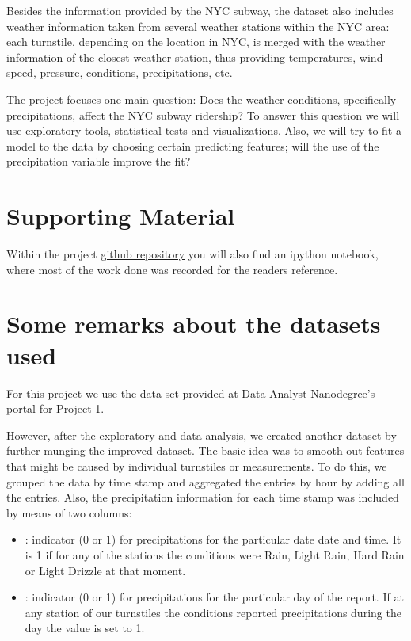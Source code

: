 \documentclass[a4paper,12pt,english]{sphinxmanual}
\begin{document}
Besides the information provided by the NYC subway, the dataset also includes
weather information taken from several weather stations within the NYC area:
each turnstile, depending on the location in NYC, is merged with the weather
information of the closest weather station, thus providing temperatures, wind
speed, pressure, conditions, precipitations, etc.

The project focuses one main question: Does the weather conditions, specifically
precipitations, affect the NYC subway ridership? To answer this question we
will use exploratory tools, statistical tests and visualizations. Also, we will
try to fit a model to the data by choosing certain predicting features; will
the use of the precipitation variable improve the fit?


\section{Supporting Material}
\label{overview:supporting-material}
Within the project \href{https://github.com/itoledoc/IntroToDS}{github repository}
you will also find an ipython notebook, where most of the work done was recorded
for the readers reference.


\section{Some remarks about the datasets used}
\label{overview:some-remarks-about-the-datasets-used}
For this project we use the data set provided at Data Analyst Nanodegree's
portal for Project 1.

However, after the exploratory and data analysis, we created another dataset by
further munging the improved dataset. The basic idea was to smooth out features
that might be caused by individual turnstiles or measurements. To do this, we
grouped the data by time stamp and aggregated the entries by hour by adding all
the entries. Also, the precipitation information for each
time stamp was included by means of two columns:
\begin{itemize}
\item {} 
: indicator (0 or 1) for precipitations for the particular date
date and time. It is 1 if for any of the stations the conditions were Rain,
Light Rain, Hard Rain or Light Drizzle at that moment.

\item {} 
: indicator (0 or 1) for precipitations for the particular day
of the report. If at any station of our turnstiles the conditions reported
precipitations during the day the value is set to 1.

\end{itemize}
\end{document}
